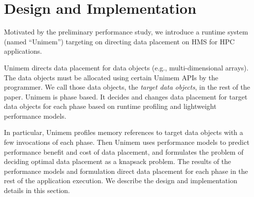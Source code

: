\section{Design and Implementation} 
\label{sec:sys_des}
Motivated by the preliminary performance study, we introduce a runtime system (named ``Unimem'') targeting on directing data placement on HMS for HPC applications.

\begin{comment}
To make Unimem a runtime for HPC applications, we have several design goals.
First, Unimem must be lightweight. This means that 
changing data placement (i.e., data movement) should have minimum impact on application performance.
This also means that the process to determine data placement
must be lightweight.
Second, enforcing data placement should be transparent to applications.
We want to enable automatic data movement, and relieve users from
handling data movement details.
Third, we want to avoid any disruptive change to applications,
such that legacy applications can be easily ported to NVM-based HMS
with few programming efforts. 
\end{comment}

Unimem directs data placement for data objects (e.g., multi-dimensional arrays). The data objects must be %
allocated using certain Unimem APIs by the programmer.
We call those data objects, the \textit{target data objects}, in the rest of the paper.
Unimem is phase based. It decides and changes data placement for target data objects for each phase based on runtime profiling and lightweight performance models.

In particular, Unimem profiles memory references to target data objects
with a few invocations of each phase. 
Then Unimem uses performance models to predict performance benefit and cost of data placement,
and formulates the problem of deciding optimal data placement as a knapsack problem. 
The results of the performance models and formulation direct data placement for each phase in the rest of the application execution.
We describe the design and implementation details in this section.

